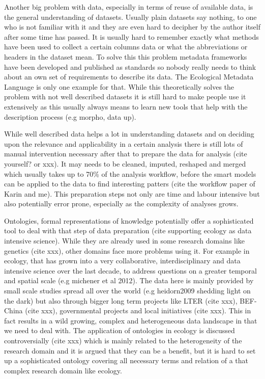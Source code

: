 \documentclass[]{article}
\begin{document}
Another big problem with data, especially in terms of reuse of available
data, is the general understanding of datasets. Usually plain datasets
say nothing, to one who is not familiar with it and they are even hard
to decipher by the author itself after some time has passed. It is
usually hard to remember exactly what methods have been used to collect
a certain columns data or what the abbreviations or headers in the
dataset mean. To solve this this problem metadata frameworks have been
developed and published as standards so nobody really needs to think
about an own set of requirements to describe its data. The Ecological
Metadata Language is only one example for that. While this theoretically
solves the problem with not well described datasets it is still hard to
make people use it extensively as this usually always means to learn new
tools that help with the description process (e.g morpho, data up).

While well described data helps a lot in understanding datasets and on
deciding upon the relevance and applicability in a certain analysis
there is still lots of manual intervention necessary after that to
prepare the data for analysis (cite yourself? or xxx). It may needs to
be cleaned, imputed, reshaped and merged which usually takes up to 70\%
of the analysis workflow, before the smart models can be applied to the
data to find interesting patters (cite the workflow paper of Karin and
me). This preparation steps not only are time and labour intensive but
also potentially error prone, especially as the complexity of analyses
grows.

Ontologies, formal representations of knowledge potentially offer a
sophisticated tool to deal with that step of data preparation (cite
supporting ecology as data intensive science). While they are already
used in some research domains like genetics (cite xxx), other domains
face more problems using it. For example in ecology, that has grown into
a very collaborative, interdisciplinary and data intensive science over
the last decade, to address questions on a greater temporal and spatial
scale (e.g michener et al 2012). The data here is mainly provided by
small scale studies spread all over the world (e.g heidorn2009 shedding
light on the dark) but also through bigger long term projects like LTER
(cite xxx), BEF-China (cite xxx), governmental projects and local
initiatives (cite xxx). This in fact results in a wild growing, complex
and heterogeneous data landscape in that we need to deal with. The
application of ontologies in ecology is discussed controversially (cite
xxx) which is mainly related to the heterogeneity of the research domain
and it is argued that they can be a benefit, but it is hard to set up a
sophisticated ontology covering all necessary terms and relation of a
that complex research domain like ecology.
\end{document}
